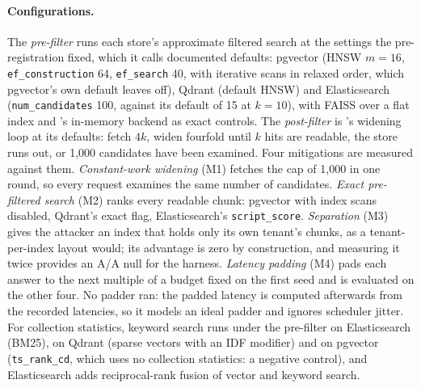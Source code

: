 \paragraph{Configurations.}
The \emph{pre-filter} runs each store's approximate filtered search at the settings the pre-registration fixed, which it calls documented defaults:
pgvector (HNSW $m = 16$, \texttt{ef\_construction} 64, \texttt{ef\_search} 40, with iterative scans in relaxed order, which pgvector's own default leaves off), Qdrant (default HNSW) and Elasticsearch (\texttt{num\_candidates} 100, against its default of 15 at $k = 10$), with FAISS over a flat index and \sys{}'s in-memory backend as
exact controls. The \emph{post-filter} is \sys{}'s widening loop at its defaults: fetch $4k$, widen
fourfold until $k$ hits are readable, the store runs out, or 1,000 candidates have been examined.
Four mitigations are measured against them. \emph{Constant-work widening} (M1) fetches the cap of
1,000 in one round, so every request examines the same number of candidates. \emph{Exact
pre-filtered search} (M2) ranks every readable chunk: pgvector with index scans disabled, Qdrant's
exact flag, Elasticsearch's \texttt{script\_score}. \emph{Separation} (M3) gives the attacker an index
that holds only its own tenant's chunks, as a tenant-per-index layout would; its advantage is zero by
construction, and measuring it twice provides an A/A null for the harness. \emph{Latency padding}
(M4) pads each answer to the next multiple of a budget fixed on the first seed and is evaluated on
the other four. No padder ran: the padded latency is computed afterwards from the recorded latencies, so it models an ideal padder and ignores scheduler jitter. For collection statistics,
keyword search runs under the pre-filter on Elasticsearch (BM25), on Qdrant (sparse vectors with an
IDF modifier) and on pgvector (\texttt{ts\_rank\_cd}, which uses no collection statistics: a
negative control), and Elasticsearch adds reciprocal-rank fusion of vector and keyword search.

